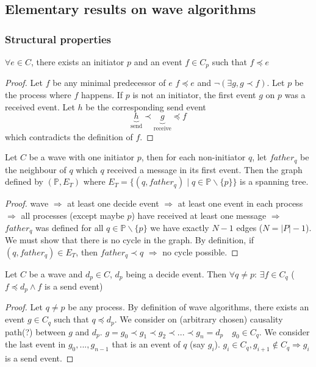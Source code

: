 \subsection{Elementary results on wave algorithms}
\subsubsection{Structural properties}
\begin{lemma}
$\forall e \in C$, there exists an initiator $p$ and an event $f\in C_p$ such that $f \preceq e$
\end{lemma}

\begin{proof}
Let $f$ be any minimal predecessor of $e$ $f \preceq e$ and $\neg (\exists g, g\prec f)$. Let $p$ be the process where $f$ happens. If $p$ is not an initiator, the first event $g$ on $p$ was a received event. Let $h$ be the corresponding send event
\[\underbrace{h}_{\text{send}} \prec \underbrace{g}_{\text{receive}}\preceq f \]
which contradicts the definition of $f$.
\end{proof}

\begin{lemma}
Let $C$ be a wave with one initiator $p$, then for each non-initiator $q$, let $father_{q}$ be the neighbour of $q$ which $q$ received a message in its first event. Then the graph defined by $(\mathbb{P}, E_T)$ where $E_T = \{(q,father_q) \;| \; q\in \mathbb{P}\smallsetminus \{ p \} \}$ is a spanning tree.
\end{lemma}

\begin{proof}
wave $\Rightarrow$ at least one decide event $\Rightarrow$ at least one event in each process $\Rightarrow$ all processes (except maybe $p$) have received at least one message $\Rightarrow$  $father_q$ was defined for all $q\in \mathbb{P} \smallsetminus \{p\}$ we have exactly $N-1$ edges ($N=|P|-1$). We must show that there is no cycle in the graph. By definition, if $(q,father_q)\in E_T$, then $father_q \prec q$ $\Rightarrow$ no cycle possible.
\end{proof}

\begin{lemma}
Let $C$ be a wave and $d_p \in C$, $d_p$ being a decide event. Then $\forall q \neq p$: $\exists f \in C_q $ ($f\preceq d_p \land f$ is a send event)
\end{lemma}

\begin{proof}
Let $q \neq p$ be any process. By definition of wave algorithms, there exists an event $g \in C_q$ such that $q\preceq d_p$. We consider on (arbitrary chosen) causality path(?) between $g$ and $d_p$.
$g=g_0 \prec g_1 \prec g_2 \prec ...\prec g_n = d_p \quad g_0\in C_q$. We consider the last event in $g_0,...,g_{n-1}$ that is an event of $q$ (say $g_i$). $g_i\in C_q, g_{i+1} \notin C_q \Rightarrow g_i$ is a send event.
\end{proof}

